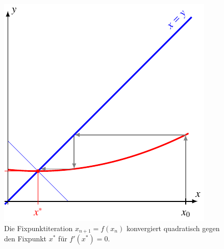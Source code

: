 \begin{figure}
\centering
\includegraphics{chapters/10-arithmetik/figures/quadratisch.pdf}
\caption{Die Fixpunktiteration $x_{n+1}=f(x_n)$ konvergiert quadratisch
gegen den Fixpunkt $x^*$
für $f'(x^*)=0$.
\label{buch:figure:fixpunkt:quadratisch}}
\end{figure}
%
